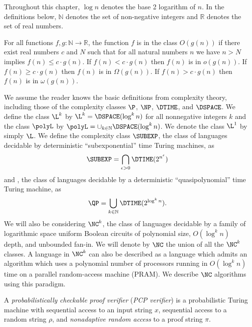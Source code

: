 Throughout this chapter, $\log n$ denotes the base 2 logarithm of $n$.
In the definitions below, $\mathbb{N}$ denotes the set of non-negative integers and $\mathbb{R}$ denotes the set of real numbers.

\begin{definition}
  For all functions $f, g \colon \mathbb{N} \to \mathbb{R}$, the function $f$ is in the class $O(g(n))$ if there exist real numbers $c$ and $N$ such that for all natural numbers $n$ we have $n > N$ implies $f(n) \leq c \cdot g(n)$.
  If $f(n) < c \cdot g(n)$ then $f(n)$ is in $o(g(n))$.
  If $f(n) \geq c \cdot g(n)$ then $f(n)$ is in $\Omega(g(n))$.
  If $f(n) > c \cdot g(n)$ then $f(n)$ is in $\omega(g(n))$.
\end{definition}

We assume the reader knows the basic definitions from complexity theory, including those of the complexity classes $\P$, $\NP$, $\DTIME$, and $\DSPACE$.
We define the class $\L^k$ by $\L^k = \DSPACE(\log^k n)$ for all nonnegative integers $k$ and the class $\polyL$ by $\polyL = \cup_{k \in \mathbb{N}} \DSPACE(\log^k n)$.
We denote the class $\L^1$ by simply $\L$.
We define the complexity class $\SUBEXP$, the class of languages decidable by deterministic ``subexponential'' time Turing machines, as
\begin{equation*}
  \SUBEXP = \bigcap_{\epsilon > 0} \DTIME(2^{n^\epsilon})
\end{equation*}
and \QP{}, the class of languages decidable by a deterministic ``quasipolynomial'' time Turing machine, as
\begin{equation*}
  \QP = \bigcup_{k \in \mathbb{N}} \DTIME(2^{\log^k n}).
\end{equation*}
We will also be considering $\NC^k$, the class of languages decidable by a family of logarithmic space uniform Boolean circuits of polynomial size, $O(\log^k n)$ depth, and unbounded fan-in.
We will denote by $\NC$ the union of all the $\NC^k$ classes.
A language in $\NC^k$ can also be described as a language which admits an algorithm which uses a polynomial number of processors running in $O(\log^k n)$ time on a parallel random-access machine (PRAM).
We describe $\NC$ algorithms using this paradigm.

\begin{definition}
  A \emph{probabilistically checkable proof verifier} (\emph{PCP verifier}) is a probabilistic Turing machine with sequential access to an input string $x$, sequential access to a random string $\rho$, and \emph{nonadaptive random access} to a proof string $\pi$.
\end{definition}

